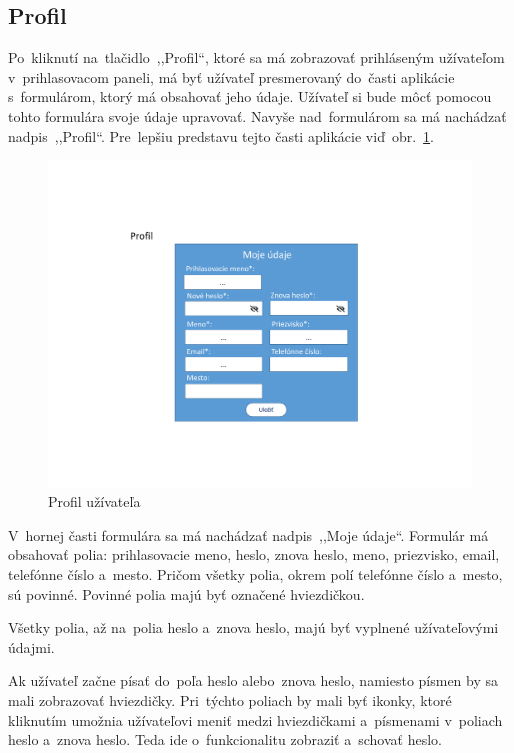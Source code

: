 \subsection{Profil}

Po~kliknutí na~tlačidlo~,,Profil``, ktoré sa má zobrazovať prihláseným užívateľom v~prihlasovacom paneli, má byť užívateľ presmerovaný do~časti aplikácie s~formulárom, ktorý má obsahovať jeho údaje. Užívateľ si bude môcť pomocou tohto formulára svoje údaje upravovať. Navyše nad~formulárom sa má nachádzať nadpis~,,Profil``. Pre~lepšiu predstavu tejto časti aplikácie viď~obr.~\ref{profile}.

\begin{figure}[H]\centering
\includegraphics[width=140mm]{../img/UI concept/profile}
\caption{Profil užívateľa}
\label{profile}
\end{figure}

V~hornej časti formulára sa má nachádzať nadpis~,,Moje údaje``. Formulár má obsahovať polia: prihlasovacie meno, heslo, znova heslo, meno, priezvisko, email, telefónne číslo a~mesto. Pričom všetky polia, okrem polí telefónne číslo a~mesto, sú povinné. Povinné polia majú byť označené hviezdičkou.

Všetky polia, až na~polia heslo a~znova heslo, majú byť vyplnené užívateľovými údajmi.

Ak užívateľ začne písať do~poľa heslo alebo~znova heslo, namiesto písmen by sa mali zobrazovať hviezdičky. Pri~týchto poliach by mali byť ikonky, ktoré kliknutím umožnia užívateľovi meniť medzi hviezdičkami a~písmenami v~poliach heslo a~znova heslo. Teda ide o~funkcionalitu zobraziť a~schovať heslo.

